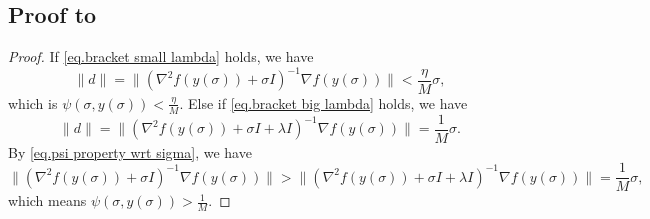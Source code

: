 \documentclass{article}
\numberwithin{equation}{section}
\numberwithin{equation}{section}
\begin{document}
\subsection*{Proof to }
\begin{proof}
    If \eqref{eq.bracket small lambda} holds, we have
    \begin{equation*}
        \|d\| = \|(\nabla^2 f(y(\sigma))+\sigma I)^{-1}\nabla f(y(\sigma))\|<\frac{\eta}{M}\sigma,
    \end{equation*}
    which is $\psi(\sigma,y(\sigma))<\frac{\eta}{M}$.
    Else if \eqref{eq.bracket big lambda} holds, we have
    \begin{equation*}
        \|d\| = \|(\nabla^2 f(y(\sigma))+\sigma I+\lambda I)^{-1}\nabla f(y(\sigma))\|=\frac{1}{M}\sigma.
    \end{equation*}
    By \eqref{eq.psi property wrt sigma}, we have
    \begin{equation*}
        \|(\nabla^2 f(y(\sigma))+\sigma I)^{-1}\nabla f(y(\sigma))\|> \|(\nabla^2 f(y(\sigma))+\sigma I+\lambda I)^{-1}\nabla f(y(\sigma))\|=\frac{1}{M}\sigma,
    \end{equation*}
    which means $\psi (\sigma,y(\sigma))>\frac{1}{M}$.
\end{proof}
\end{document}
